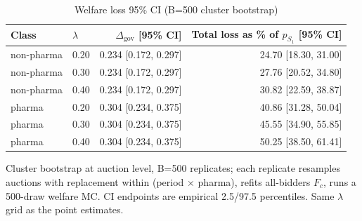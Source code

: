 \begin{table}[htbp]
\centering
\begin{threeparttable}
\caption{Welfare loss 95\% CI (B=500 cluster bootstrap)}
\label{tab:v3_welfare_ci}
\small
\begin{tabular}{llrr}
\toprule
Class & $\lambda$ & $\Delta_{\text{gov}}$ [95\% CI] & Total loss as \% of $p_{S_1}$ [95\% CI] \\
\midrule
non-pharma & 0.20 & 0.234 [0.172, 0.297] & 24.70 [18.30, 31.00] \\
non-pharma & 0.30 & 0.234 [0.172, 0.297] & 27.76 [20.52, 34.80] \\
non-pharma & 0.40 & 0.234 [0.172, 0.297] & 30.82 [22.59, 38.87] \\
pharma & 0.20 & 0.304 [0.234, 0.375] & 40.86 [31.28, 50.04] \\
pharma & 0.30 & 0.304 [0.234, 0.375] & 45.55 [34.90, 55.85] \\
pharma & 0.40 & 0.304 [0.234, 0.375] & 50.25 [38.50, 61.41] \\
\bottomrule
\end{tabular}
\begin{tablenotes}\footnotesize
\item Cluster bootstrap at auction level, B=500 replicates;
each replicate resamples auctions with replacement within
(period $\times$ pharma), refits all-bidders $F_c$, runs a
500-draw welfare MC. CI endpoints are empirical 2.5/97.5
percentiles. Same $\lambda$ grid as the point estimates.
\end{tablenotes}
\end{threeparttable}
\end{table}

